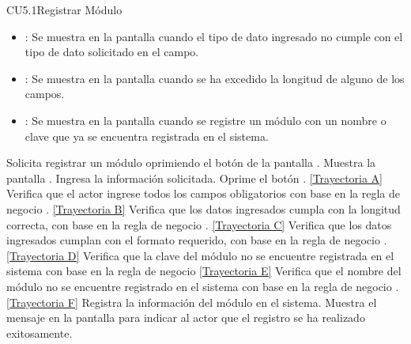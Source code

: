 \begin{UseCase}{CU5.1}{Registrar Módulo}
{\begin{itemize}
		\item {}: Se muestra en la pantalla  cuando el tipo de dato ingresado no cumple con el tipo de dato solicitado en
		el campo.
		\item {}: Se muestra en la pantalla  cuando se ha excedido la longitud de alguno de los campos.
		\item {}: Se muestra en la pantalla  cuando se registre un módulo con un nombre o clave que ya se encuentra registrada en el sistema.
		\end{itemize}
		}
	\end{UseCase}
	\begin{UCtrayectoria}
		\UCpaso[\UCactor] Solicita registrar un módulo oprimiendo el botón  de la pantalla .
		\UCpaso[\UCsist] Muestra la pantalla .
		\UCpaso[\UCactor] Ingresa la información solicitada. \label{CU5.1-P3}
		\UCpaso[\UCactor] Oprime el botón . \hyperlink{CU5-1:TAA}{[Trayectoria A]}
		\UCpaso[\UCsist] Verifica que el actor ingrese todos los campos obligatorios con base en la regla de negocio . \hyperlink{CU5-1:TAB}{[Trayectoria B]}
		\UCpaso[\UCsist] Verifica que los datos ingresados cumpla con la longitud correcta, con base en la regla de negocio . \hyperlink{CU5-1:TAC}{[Trayectoria C]}
		\UCpaso[\UCsist] Verifica que los datos ingresados cumplan con el formato requerido, con base en la regla de negocio . \hyperlink{CU5-1:TAD}{[Trayectoria D]}
		\UCpaso[\UCsist] Verifica que la clave del módulo no se encuentre registrada en el sistema con base en la regla de negocio  \hyperlink{CU5-1:TAE}{[Trayectoria E]}
		\UCpaso[\UCsist] Verifica que el nombre del módulo no se encuentre registrado en el sistema con base en la regla de negocio . \hyperlink{CU5-1:TAF}{[Trayectoria F]}
		\UCpaso[\UCsist] Registra la información del módulo en el sistema.
		\UCpaso[\UCsist] Muestra el mensaje  en la pantalla  para indicar al actor que el registro se ha realizado exitosamente.
	\end{UCtrayectoria}		
